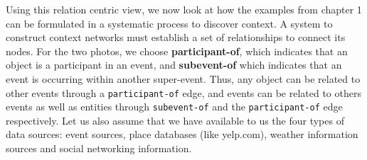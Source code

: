 Using this relation centric view, we now look at how the examples from chapter 1 can be formulated in a systematic process to discover context. A system to construct context networks must establish a set of relationships to connect its nodes. For the two photos, we choose \textbf{participant-of}, which indicates that an object is a participant in an event, and \textbf{subevent-of} which indicates that an event is occurring within another super-event. Thus, any object can be related to other events through a \texttt{participant-of} edge, and events can be related to others events as well as entities through \texttt{subevent-of} and the \texttt{participant-of} edge respectively. Let us also assume that we have available to us the four types of data sources: event sources, place databases (like yelp.com), weather information sources and social networking information.

